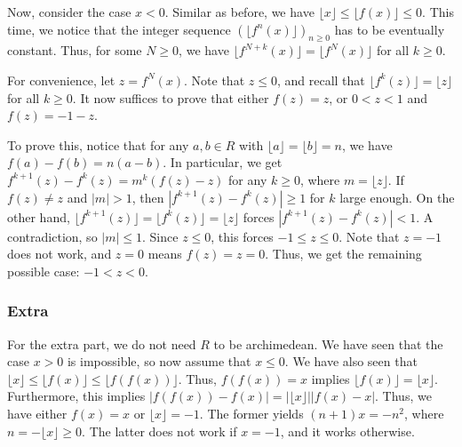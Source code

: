 \documentclass{article}
\begin{document}
Now, consider the case $x < 0$.
Similar as before, we have $\lfloor x \rfloor \leq \lfloor f(x) \rfloor \leq 0$.
This time, we notice that the integer sequence $\left(\lfloor f^n(x) \rfloor\right)_{n \geq 0}$ has to be eventually constant.
Thus, for some $N \geq 0$, we have $\lfloor f^{N + k}(x) \rfloor = \lfloor f^N(x) \rfloor$ for all $k \geq 0$.

For convenience, let $z = f^N(x)$.
Note that $z \leq 0$, and recall that $\lfloor f^k(z) \rfloor = \lfloor z \rfloor$ for all $k \geq 0$.
It now suffices to prove that either $f(z) = z$, or $0 < z < 1$ and $f(z) = -1 - z$.

To prove this, notice that for any $a, b \in R$ with $\lfloor a \rfloor = \lfloor b \rfloor = n$, we have $f(a) - f(b) = n(a - b)$.
In particular, we get $f^{k + 1}(z) - f^k(z) = m^k(f(z) - z)$ for any $k \geq 0$, where $m = \lfloor z \rfloor$.
If $f(z) \neq z$ and $|m| > 1$, then $|f^{k + 1}(z) - f^k(z)| \geq 1$ for $k$ large enough.
On the other hand, $\lfloor f^{k + 1}(z) \rfloor = \lfloor f^k(z) \rfloor = \lfloor z \rfloor$ forces $|f^{k + 1}(z) - f^k(z)| < 1$.
A contradiction, so $|m| \leq 1$.
Since $z \leq 0$, this forces $-1 \leq z \leq 0$.
Note that $z = -1$ does not work, and $z = 0$ means $f(z) = z = 0$.
Thus, we get the remaining possible case: $-1 < z < 0$.

\subsubsection*{Extra}

For the extra part, we do not need $R$ to be archimedean.
We have seen that the case $x > 0$ is impossible, so now assume that $x \leq 0$.
We have also seen that $\lfloor x \rfloor \leq \lfloor f(x) \rfloor \leq \lfloor f(f(x)) \rfloor$.
Thus, $f(f(x)) = x$ implies $\lfloor f(x) \rfloor = \lfloor x \rfloor$.
Furthermore, this implies $|f(f(x)) - f(x)| = |\lfloor x \rfloor| |f(x) - x|$.
Thus, we have either $f(x) = x$ or $\lfloor x \rfloor = -1$.
The former yields $(n + 1)x = -n^2$, where $n = -\lfloor x \rfloor \geq 0$.
The latter does not work if $x = -1$, and it works otherwise.
\end{document}

